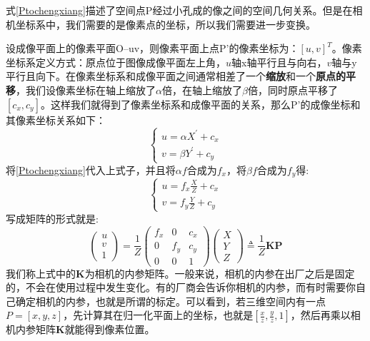 式\ref{Ptochengxiang}描述了空间点P经过小孔成的像之间的空间几何关系。但是在相机坐标系中，我们需要的是像素点的坐标，所以我们需要进一步变换。\par
设成像平面上的像素平面O–uv，则像素平面上点P'的像素坐标为：$[u, v]^{T}$。像素坐标系定义方式：原点位于图像成像平面左上角，$u$轴x轴平行且与向右，$v$轴与y平行且向下。在像素坐标系和成像平面之间通常相差了一个\textbf{缩放}和一个\textbf{原点的平移}，我们设像素坐标在轴上缩放了$\alpha$倍，在轴上缩放了$\beta$倍，同时原点平移了$\left[c_{x}, c_{y}\right]$。这样我们就得到了像素坐标系和成像平面的关系，那么P'的成像坐标和其像素坐标关系如下：
\begin{equation}
\left\{\begin{array}{l}{u=\alpha X^{\prime}+c_{x}} \\ {v=\beta Y^{\prime}+c_{y}}\end{array}\right.
\label{chengxiangtopixel}
\end{equation}
将\ref{Ptochengxiang}代入上式子，并且将$\alpha f$合成为$f_x$，将$\beta f$合成为$f_y$得:
\begin{equation}
\left\{\begin{array}{l}{u=f_{x} \frac{X}{Z}+c_{x}} \\ {v=f_{y} \frac{Y}{Z}+c_{y}}\end{array}\right.
\end{equation}
写成矩阵的形式就是:
\begin{equation}
\left( \begin{array}{l}{u} \\ {v} \\ {1}\end{array}\right)=\frac{1}{Z} \left( \begin{array}{ccc}{f_{x}} & {0} & {c_{x}} \\ {0} & {f_{y}} & {c_{y}} \\ {0} & {0} & {1}\end{array}\right) \left( \begin{array}{l}{X} \\ {Y} \\ {Z}\end{array}\right) \triangleq \frac{1}{Z}\boldsymbol{KP}
\label{cameratopix}
\end{equation}
我们称上式中的\textbf{K}为相机的内参矩阵。一般来说，相机的内参在出厂之后是固定的，不会在使用过程中发生变化。有的厂商会告诉你相机的内参，而有时需要你自己确定相机的内参，也就是所谓的标定。可以看到，若三维空间内有一点$P=[x,y,z]$，先计算其在归一化平面上的坐标，也就是$[\frac{x}{z},\frac{y}{z},1]$，然后再乘以相机内参矩阵\textbf{K}就能得到像素位置。\par
